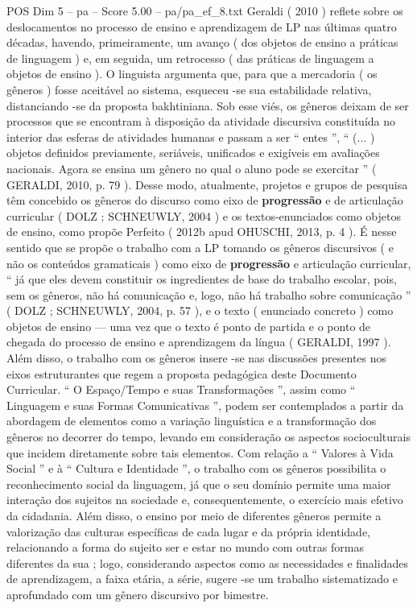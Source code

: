 \begin{textsample}{POS Dim 5 – pa – Score 5.00 – pa/pa\_ef\_8.txt}
Geraldi ( 2010 ) reflete sobre os deslocamentos no processo de ensino e aprendizagem de LP nas últimas quatro décadas, havendo, primeiramente, um avanço ( dos objetos de ensino a práticas de linguagem ) e, em seguida, um retrocesso ( das práticas de linguagem a objetos de ensino ).
O linguista argumenta que, para que a mercadoria ( os gêneros ) fosse aceitável ao sistema, esqueceu -se sua estabilidade relativa, distanciando -se da proposta bakhtiniana.
Sob esse viés, os gêneros deixam de ser processos que se encontram à disposição da atividade discursiva constituída no interior das esferas de atividades humanas e passam a ser “ entes ”, “ (... ) objetos definidos previamente, seriáveis, unificados e exigíveis em avaliações nacionais.
Agora se ensina um gênero no qual o aluno pode se exercitar ” ( GERALDI, 2010, p. 79 ).
Desse modo, atualmente, projetos e grupos de pesquisa têm concebido os gêneros do discurso como eixo de \textbf{progressão} e de articulação curricular ( DOLZ ; SCHNEUWLY, 2004 ) e os textos-enunciados como objetos de ensino, como propõe Perfeito ( 2012b apud OHUSCHI, 2013, p. 4 ).
É nesse sentido que se propõe o trabalho com a LP tomando os gêneros discursivos ( e não os conteúdos gramaticais ) como eixo de \textbf{progressão} e articulação curricular, “ já que eles devem constituir os ingredientes de base do trabalho escolar, pois, sem os gêneros, não há comunicação e, logo, não há trabalho sobre comunicação ” ( DOLZ ; SCHNEUWLY, 2004, p. 57 ), e o texto ( enunciado concreto ) como objetos de ensino — uma vez que o texto é ponto de partida e o ponto de chegada do processo de ensino e aprendizagem da língua ( GERALDI, 1997 ).
Além disso, o trabalho com os gêneros insere -se nas discussões presentes nos eixos estruturantes que regem a proposta pedagógica deste Documento Curricular. “ O Espaço/Tempo e suas Transformações ”, assim como “ Linguagem e suas Formas Comunicativas ”, podem ser contemplados a partir da abordagem de elementos como a variação linguística e a transformação dos gêneros no decorrer do tempo, levando em consideração os aspectos socioculturais que incidem diretamente sobre tais elementos.
Com relação a “ Valores à Vida Social ” e à “ Cultura e Identidade ”, o trabalho com os gêneros possibilita o reconhecimento social da linguagem, já que o seu domínio permite uma maior interação dos sujeitos na sociedade e, consequentemente, o exercício mais efetivo da cidadania.
Além disso, o ensino por meio de diferentes gêneros permite a valorização das culturas específicas de cada lugar e da própria identidade, relacionando a forma do sujeito ser e estar no mundo com outras formas diferentes da sua ; logo, considerando aspectos como as necessidades e finalidades de aprendizagem, a faixa etária, a série, sugere -se um trabalho sistematizado e aprofundado com um gênero discursivo por bimestre.

\end{textsample}
